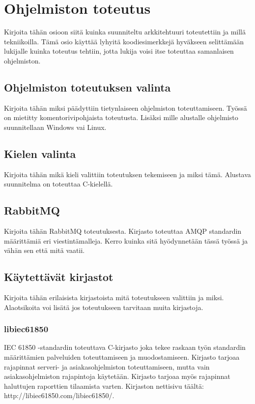 \documentclass[globalnumbering,centeredcaptions,draftfooter]{tutthesis} %
\begin{document}
\chapter{Ohjelmiston toteutus}
\label{ch:ohjelmiston toteutus}
Kirjoita tähän osioon siitä kuinka suunniteltu arkkitehtuuri toteutettiin ja millä tekniikoilla. Tämä osio käyttää lyhyitä koodiesimerkkejä hyväkseen selittämään lukijalle kuinka toteutus tehtiin, jotta lukija voisi itse toteuttaa samanlaisen ohjelmiston.

\section{Ohjelmiston toteutuksen valinta}
Kirjoita tähän miksi päädyttiin tietynlaiseen ohjelmiston toteuttamiseen. Työssä on mietitty komentorivipohjaista toteutusta. Lisäksi mille alustalle ohjelmisto suunnitellaan Windows vai Linux.

\section{Kielen valinta}
Kirjoita tähän mikä kieli valittiin toteutuksen tekemiseen ja miksi tämä. Alustava suunnitelma on toteuttaa C-kielellä.

\section{RabbitMQ}
Kirjoita tähän RabbitMQ toteutuksesta. Kirjasto toteuttaa AMQP standardin määrittämiä eri viestintämalleja. Kerro kuinka sitä hyödynnetään tässä työssä ja vähän sen että mitä vaatii.

\section{Käytettävät kirjastot}
Kirjoita tähän erilaisista kirjastoista mitä toteutukseen valittiin ja miksi. Alaotsikoita voi lisätä jos toteutukseen tarvitaan muita kirjastoja.

\subsection{libiec61850}
IEC 61850 -standardin toteuttava C-kirjasto joka tekee raskaan työn standardin määrittämien palveluiden toteuttamiseen ja muodostamiseen. Kirjasto tarjoaa rajapinnat serveri- ja asiakasohjelmiston toteuttamiseen, mutta vain asiakasohjelmiston rajapintoja käytetään. Kirjasto tarjoaa myös rajapinnat haluttujen raporttien tilaamista varten. Kirjaston nettisivu täältä: http://libiec61850.com/libiec61850/.
\end{document}
